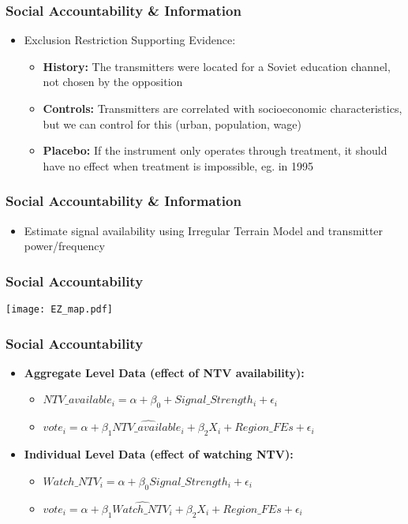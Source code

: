 \documentclass[xcolor=x11names,compress]{beamer}\usepackage[]{graphicx}\usepackage[]{color}
\renewcommand{\(}{\begin{columns}}
\renewcommand{\)}{\end{columns}}
\newcommand{\<}[1]{\begin{column}{#1}}
\renewcommand{\>}{\end{column}}
\begin{document}
\begin{frame}
\frametitle{Social Accountability \& Information}
\begin{itemize}
\item Exclusion Restriction Supporting Evidence:
\begin{itemize}
\item \textbf{History:} The transmitters were located for a Soviet education channel, not chosen by the opposition
\pause
\item \textbf{Controls:} Transmitters are correlated with socioeconomic characteristics, but we can control for this (urban, population, wage)
\pause
\item \textbf{Placebo:} If the instrument only operates through treatment, it should have no effect when treatment is impossible, eg. in 1995
\end{itemize}
\end{itemize}
\end{frame}

\begin{frame}
\frametitle{Social Accountability \& Information}
\begin{itemize}
\item Estimate signal availability using Irregular Terrain Model and transmitter power/frequency
\end{itemize}
\end{frame}

\begin{frame}
\frametitle{Social Accountability}
\begin{center}
\texttt{[image: EZ\_map.pdf]}
\end{center}
\end{frame}

\begin{frame}
\frametitle{Social Accountability}
\begin{itemize}
\item \textbf{Aggregate Level Data (effect of NTV availability):}
\begin{itemize}
\item $NTV\_available_i =  \alpha + \beta_0 + Signal\_Strength_i + \epsilon_i$
\item $vote_i = \alpha + \beta_1 \hat{NTV\_available_i} + \beta_2 X_i + Region\_FEs + \epsilon_i$
\end{itemize}
\pause
\item \textbf{Individual Level Data (effect of watching NTV):}
\begin{itemize}
\item $Watch\_NTV_i = \alpha + \beta_0 Signal\_Strength_i + \epsilon_i$
\item $vote_i = \alpha + \beta_1 \hat{Watch\_NTV_i} + \beta_2 X_i + Region\_FEs + \epsilon_i$
\end{itemize}
\end{itemize}
\end{frame}
\end{document}
